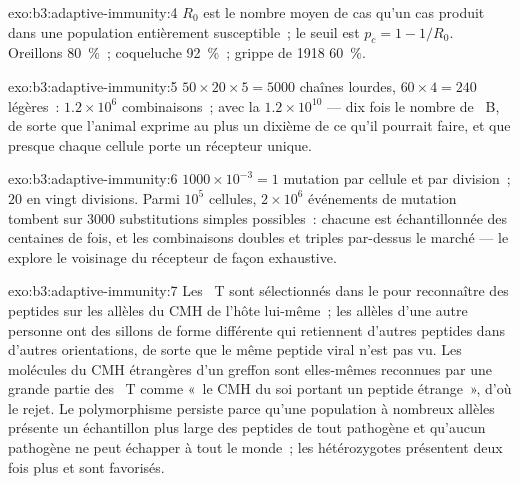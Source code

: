 \begin{solution}{exo:b3:adaptive-immunity:4}
$R_{0}$ est le nombre moyen de cas qu'un cas produit dans une population
entièrement susceptible~; le seuil est $p_{c} = 1 - 1/R_{0}$. Oreillons
\qty{80}{\%}~; coqueluche \qty{92}{\%}~; grippe de 1918 \qty{60}{\%}.
\end{solution}

\begin{solution}{exo:b3:adaptive-immunity:5}
$50\times 20\times 5 = 5000$ chaînes lourdes, $60\times 4 = 240$
légères~: $1.2\times 10^{6}$ combinaisons~; avec la  $1.2\times
10^{10}$ --- dix fois le nombre de ~B, de sorte que l'animal
exprime au plus un dixième de ce qu'il pourrait faire, et que presque
chaque cellule porte un récepteur unique.
\end{solution}

\begin{solution}{exo:b3:adaptive-immunity:6}
$1000\times 10^{-3} = 1$ mutation par cellule et par division~; $20$ en
vingt divisions. Parmi $10^{5}$ cellules, $2\times 10^{6}$ événements de
mutation tombent sur $3000$ substitutions simples possibles~: chacune
est échantillonnée des centaines de fois, et les combinaisons doubles et
triples par-dessus le marché --- le  explore le
voisinage du récepteur de façon exhaustive.
\end{solution}

\begin{solution}{exo:b3:adaptive-immunity:7}
Les ~T sont sélectionnés dans le  pour reconnaître des
peptides sur les allèles du CMH de l'hôte lui-même~; les allèles d'une
autre personne ont des sillons de forme différente qui retiennent
d'autres peptides dans d'autres orientations, de sorte que le même
peptide viral n'est pas vu. Les molécules du CMH étrangères d'un
greffon sont elles-mêmes reconnues par une grande partie des
~T comme «~le CMH du soi portant un peptide étrange~», d'où
le rejet. Le polymorphisme persiste parce qu'une population à nombreux
allèles présente un échantillon plus large des peptides de tout
pathogène et qu'aucun pathogène ne peut échapper à tout le monde~; les
hétérozygotes présentent deux fois plus et sont favorisés.
\end{solution}

